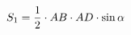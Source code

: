 \documentclass[preview]{standalone}
\begin{document}
\begin{align*}
\special{dvisvgm:raw <g id='unique000'>}S_1=\frac12\cdot AB\cdot AD\cdot \sin\alpha\special{dvisvgm:raw </g>}
\end{align*}
\end{document}
